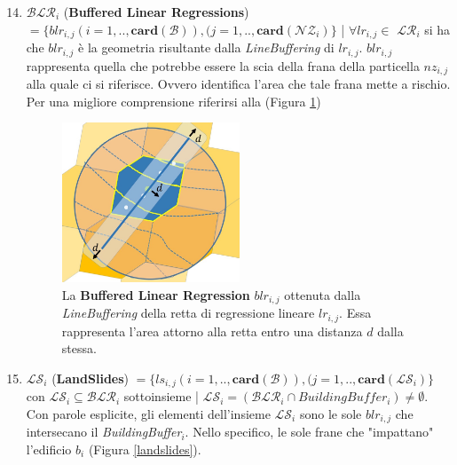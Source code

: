 \begin{enumerate}
	\setcounter{enumi}{13}
	\item \textbf{$ \mathcal{BLR}_i $} (\textbf{Buffered Linear Regressions}) $= \{blr_{i,j}(i=1,..,\mathbf{card}(\mathcal{B})),(j=1,..,\mathbf{card}(\mathcal{NZ}_i)\}$ | $\forall lr_{i,j} \in $ \textbf{$ \mathcal{LR}_i $} si ha che $blr_{i,j}$ è la geometria risultante dalla \textit{LineBuffering} di $lr_{i,j}$. $blr_{i,j}$ rappresenta quella che potrebbe essere la scia della frana della particella $nz_{i,j}$ alla quale ci si riferisce. Ovvero identifica l'area che tale frana mette a rischio. 
	Per una migliore comprensione riferirsi alla (Figura \ref{buffer_regression})
	
	\begin{figure}[h]
		\centering
		\includegraphics[width=0.5\textwidth]{images/buffer_rect}
		\caption{La \textbf{Buffered Linear Regression} $blr_{i,j}$ ottenuta dalla \textit{LineBuffering} della retta di regressione lineare $lr_{i,j}$. Essa rappresenta l'area attorno alla retta entro una distanza $d$ dalla stessa.}
		\label{buffer_regression}
	\end{figure}
	
	\item \textbf{$ \mathcal{LS}_i $} (\textbf{LandSlides}) $ = \{ls_{i,j}(i=1,..,\mathbf{card}(\mathcal{B})),(j=1,..,\mathbf{card}(\mathcal{LS}_i)\}$ con $\mathcal{LS}_i \subseteq \mathcal{BLR}_i$  sottoinsieme | $\mathcal{LS}_i = (\mathcal{BLR}_i  \cap BuildingBuffer_i)	\not= \emptyset $.
	Con parole esplicite, gli elementi dell'insieme $ \mathcal{LS}_i $ sono	le sole $blr_{i,j}$ che intersecano il \textit{BuildingBuffer$_i$}. Nello specifico, le sole frane che "impattano" l'edificio $b_i$ (Figura \ref{landslides}).
	

\end{enumerate}
